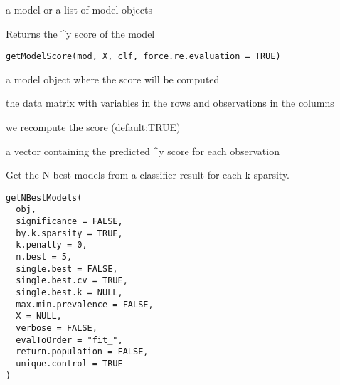 \documentclass[a4paper]{book}
\begin{document}
%
\begin{Value}
a model or a list of model objects
\end{Value}
%
\begin{Description}
Returns the \textasciicircum{}y score of the model
\end{Description}
%
\begin{Usage}
\begin{verbatim}
getModelScore(mod, X, clf, force.re.evaluation = TRUE)
\end{verbatim}
\end{Usage}
%
\begin{Arguments}
\begin{ldescription}
\item[\code{mod:}] a model object where the score will be computed

\item[\code{X:}] the data matrix with variables in the rows and observations in the columns

\item[\code{force.re.evaluation:}] we recompute the score (default:TRUE)
\end{ldescription}
\end{Arguments}
%
\begin{Value}
a vector containing the predicted \textasciicircum{}y score for each observation
\end{Value}
%
\begin{Description}
Get the N best models from a classifier result for each k-sparsity.
\end{Description}
%
\begin{Usage}
\begin{verbatim}
getNBestModels(
  obj,
  significance = FALSE,
  by.k.sparsity = TRUE,
  k.penalty = 0,
  n.best = 5,
  single.best = FALSE,
  single.best.cv = TRUE,
  single.best.k = NULL,
  max.min.prevalence = FALSE,
  X = NULL,
  verbose = FALSE,
  evalToOrder = "fit_",
  return.population = FALSE,
  unique.control = TRUE
)
\end{verbatim}
\end{Usage}
%
\end{document}
